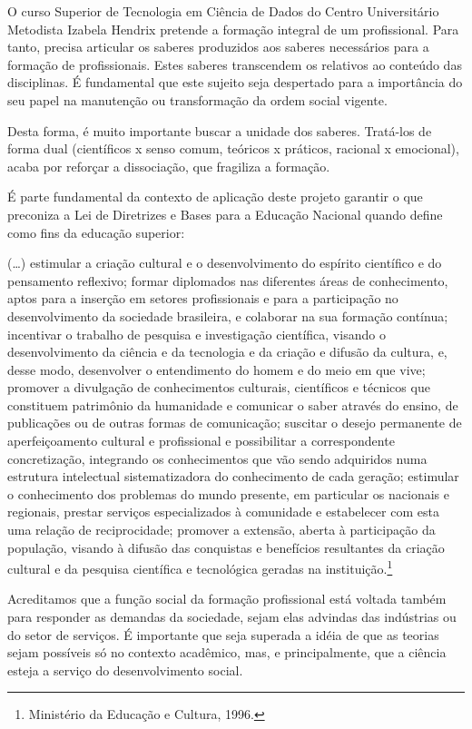 \documentclass[a4paper, 12pt, openright, oneside, german, french, english, brazil]{abntex2}
\begin{document}
O curso Superior de Tecnologia em Ciência de Dados do Centro Universitário Metodista Izabela Hendrix pretende a formação integral de um profissional. Para tanto, precisa articular os saberes produzidos aos saberes necessários para a formação de profissionais. Estes saberes transcendem os relativos ao conteúdo das disciplinas. É fundamental que este sujeito seja despertado para a importância do seu papel na manutenção ou transformação da ordem social vigente.

Desta forma, é muito importante buscar a unidade dos saberes. Tratá-los de forma dual (científicos x senso comum, teóricos x práticos, racional x emocional), acaba por reforçar a dissociação, que fragiliza a formação.

É parte fundamental da contexto de aplicação deste projeto garantir o que preconiza a Lei de Diretrizes e Bases para a Educação Nacional quando define como fins da educação superior:

\begin{citacao}
  (\dots) estimular a criação cultural e o desenvolvimento do espírito científico e do pensamento reflexivo; formar diplomados nas diferentes áreas de conhecimento, aptos para a inserção em setores profissionais e para a participação no desenvolvimento da sociedade brasileira, e colaborar na sua formação contínua; incentivar o trabalho de pesquisa e investigação científica, visando o desenvolvimento da ciência e da tecnologia e da criação e difusão da cultura, e, desse modo, desenvolver o entendimento do homem e do meio em que vive; promover a divulgação de conhecimentos culturais, científicos e técnicos que constituem patrimônio da humanidade e comunicar o saber através do ensino, de publicações ou de outras formas de comunicação; suscitar o desejo permanente de aperfeiçoamento cultural e profissional e possibilitar a correspondente concretização, integrando os conhecimentos que vão sendo adquiridos numa estrutura intelectual sistematizadora do conhecimento de cada geração; estimular o conhecimento dos problemas do mundo presente, em particular os nacionais e regionais, prestar serviços especializados à comunidade e estabelecer com esta uma relação de reciprocidade; promover a extensão, aberta à participação da população, visando à difusão das conquistas e benefícios resultantes da criação cultural e da pesquisa científica e tecnológica geradas na instituição.\footnote{Ministério da Educação e Cultura, 1996.}
\end{citacao}

Acreditamos que a função social da formação profissional está voltada também para responder as demandas da sociedade, sejam elas advindas das indústrias ou do setor de serviços. É importante que seja superada a idéia de que as teorias sejam possíveis só no contexto acadêmico, mas, e principalmente, que a ciência esteja a serviço do desenvolvimento social.
\end{document}
